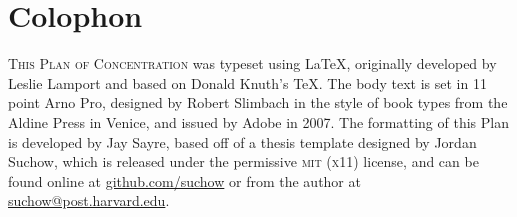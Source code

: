 \chapter*{Colophon}

\begin{center}
\parbox{200pt}{\raggedright\lettrine[lines=3,slope=-2pt,nindent=-4pt]{\textcolor{Customcolor}{T}}{his Plan of Concentration} was typeset using \LaTeX, originally developed by Leslie Lamport and based on Donald Knuth's \TeX. The body text is set in 11 point Arno Pro, designed by Robert Slimbach in the style of book types from the Aldine Press in Venice, and issued by Adobe in 2007. The formatting of this Plan is developed by Jay Sayre, based off of a thesis template designed by Jordan Suchow, which is released under the permissive \textsc{mit} (\textsc{x}11) license, and can be found online at \href{https://github.com/suchow/}{github.com/suchow} or from the author at \href{mailto:suchow@fas.harvard.edu}{suchow@post.harvard.edu}.
}
\end{center}
